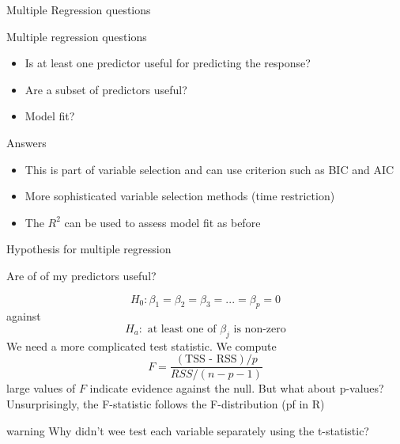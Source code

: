 \documentclass{bredelebeamer}
\begin{document}
\begin{frame}{Multiple Regression questions}

\begin{exampleblock}{Multiple regression questions}
	
	\begin{itemize}
\item Is at least one predictor useful for predicting the response?
\item Are a subset of predictors useful?
\item Model fit?
	\end{itemize}
\end{exampleblock}
\begin{block}{Answers}
	
	\begin{itemize}
		\item This is part of variable selection and can use criterion such as BIC and AIC
		\item More sophisticated variable selection methods (time restriction)
		\item The $R^2$ can be used to assess model fit as before
	\end{itemize}

\end{block}
\end{frame}


\begin{frame}{Hypothesis for multiple regression}
\begin{block}{Are of of my predictors useful?}
	
\begin{equation}
H_0: \beta_1 = \beta_2 = \beta_3 = ... = \beta_p = 0
\end{equation}
against
\begin{equation}
H_a: \text{ at least one of $\beta_j$ is non-zero}
\end{equation}
We need a more complicated test statistic. We compute
\begin{equation}
F = \frac{(\text{TSS - RSS})/p}{RSS/(n - p - 1)}
\end{equation}
large values of $F$ indicate evidence against the null. But what about p-values?
Unsurprisingly, the F-statistic follows the F-distribution (pf in R)
\end{block}
\begin{alertblock}{warning}
 Why didn't wee test each variable separately using the t-statistic?
\end{alertblock}
\end{frame}
\end{document}
